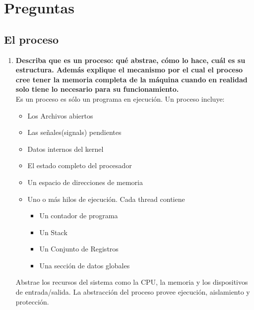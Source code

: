 \documentclass[../main.tex]{subfiles}
\begin{document}

\section{Preguntas}
    \subsection*{El proceso}
        \begin{enumerate}
            \item 
                \textbf{Describa que es un proceso: qué abstrae, cómo lo hace, cuál es su estructura. Además explique el mecanismo por el cual el proceso cree tener la memoria completa de la máquina cuando en realidad solo tiene lo necesario para su funcionamiento.}\\
                Es un proceso es sólo un programa en ejecución. Un proceso incluye:
                \begin{itemize}
                    \item Los Archivos abiertos
                    \item Las señales(signals) pendientes
                    \item Datos internos del kernel
                    \item El estado completo del procesador
                    \item Un espacio de direcciones de memoria
                    \item Uno o más hilos de ejecución. Cada thread contiene
                    \begin{itemize}
                        \item Un contador de programa
                        \item Un Stack
                        \item Un Conjunto de Registros
                        \item Una sección de datos globales
                    \end{itemize}
                \end{itemize}

                Abstrae los recursos del sistema como la CPU, la memoria y los dispositivos de entrada/salida. La abstracción del proceso provee ejecución, aislamiento y protección.


\end{enumerate}
\end{document}
